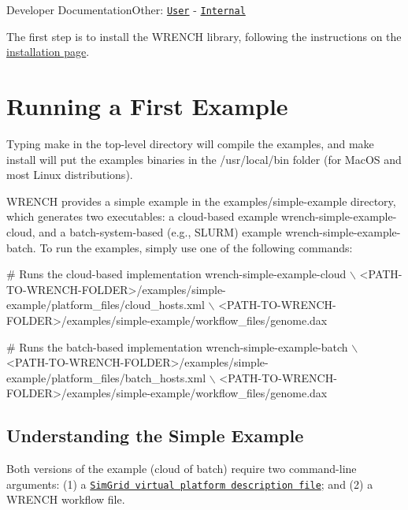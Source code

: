 Developer DocumentationOther\+: \href{../user/getting-started.html}{\tt User} -\/ \href{../internal/getting-started.html}{\tt Internal}

The first step is to install the W\+R\+E\+N\+CH library, following the instructions on the \hyperlink{install}{installation page}.\hypertarget{getting-started_getting-started-example}{}\section{Running a First Example}\label{getting-started_getting-started-example}
Typing {\ttfamily make} in the top-\/level directory will compile the examples, and {\ttfamily make install} will put the examples binaries in the {\ttfamily /usr/local/bin} folder (for Mac\+OS and most Linux distributions).

W\+R\+E\+N\+CH provides a simple example in the {\ttfamily examples/simple-\/example} directory, which generates two executables\+: a cloud-\/based example {\ttfamily wrench-\/simple-\/example-\/cloud}, and a batch-\/system-\/based (e.\+g., S\+L\+U\+RM) example {\ttfamily wrench-\/simple-\/example-\/batch}. To run the examples, simply use one of the following commands\+:


\begin{DoxyCode}
# Runs the cloud-based implementation
wrench-simple-example-cloud \(\backslash\)
    <PATH-TO-WRENCH-FOLDER>/examples/simple-example/platform\_files/cloud\_hosts.xml \(\backslash\)
    <PATH-TO-WRENCH-FOLDER>/examples/simple-example/workflow\_files/genome.dax

# Runs the batch-based implementation
wrench-simple-example-batch \(\backslash\)
    <PATH-TO-WRENCH-FOLDER>/examples/simple-example/platform\_files/batch\_hosts.xml \(\backslash\)
    <PATH-TO-WRENCH-FOLDER>/examples/simple-example/workflow\_files/genome.dax
\end{DoxyCode}
\hypertarget{getting-started_getting-started-example-simple}{}\subsection{Understanding the Simple Example}\label{getting-started_getting-started-example-simple}
Both versions of the example (cloud of batch) require two command-\/line arguments\+: (1) a \href{http://simgrid.gforge.inria.fr/simgrid/3.19/doc/platform.html}{\tt Sim\+Grid virtual platform description file}; and (2) a W\+R\+E\+N\+CH workflow file.


